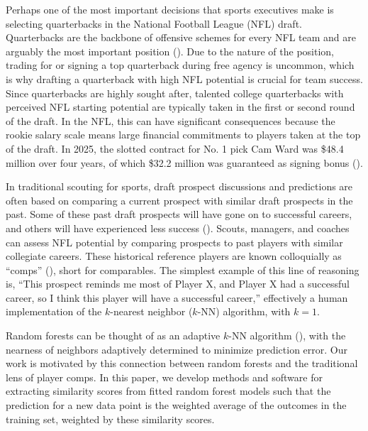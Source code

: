 \documentclass{article}
\begin{document}
Perhaps one of the most important decisions that sports executives make is selecting quarterbacks in the National Football League (NFL) draft. Quarterbacks are the backbone of offensive schemes for every NFL team and are arguably the most important position (\cite{hughes_positional_2015}). Due to the nature of the position, trading for or signing a top quarterback during free agency is uncommon, which is why drafting a quarterback with high NFL potential is crucial for team success. Since quarterbacks are highly sought after, talented college quarterbacks with perceived NFL starting potential are typically taken in the first or second round of the draft. In the NFL, this can have significant consequences because the rookie salary scale means large financial commitments to players taken at the top of the draft. In 2025, the slotted contract for No. 1 pick Cam Ward was \$48.4 million over four years, of which \$32.2 million was guaranteed as signing bonus (\cite{badenhausen_nfl_2025}).

In traditional scouting for sports, draft prospect discussions and predictions are often based on comparing a current prospect with similar draft prospects in the past. Some of these past draft prospects will have gone on to successful careers, and others will have experienced less success (\cite{trapasso_nfl_2025}). Scouts, managers, and coaches can assess NFL potential by comparing prospects to past players with similar collegiate careers. These historical reference players are known colloquially as ``comps'' (\cite{jones_nfl_2025}), short for comparables. The simplest example of this line of reasoning is, ``This prospect reminds me most of Player X, and Player X had a successful career, so I think this player will have a successful career,'' effectively a human implementation of the $k$-nearest neighbor ($k$-NN) algorithm, with $k = 1$.

Random forests can be thought of as an adaptive $k$-NN algorithm (\cite{lin_random_2006}), with the nearness of neighbors adaptively determined to minimize prediction error. Our work is motivated by this connection between random forests and the traditional lens of player comps. In this paper, we develop methods and software for extracting similarity scores from fitted random forest models such that the prediction for a new data point is the weighted average of the outcomes in the training set, weighted by these similarity scores.
\end{document}
